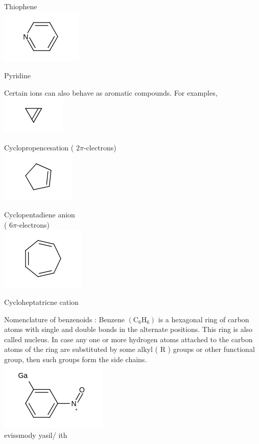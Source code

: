 \documentclass[10pt]{article}
\begin{document}
Thiophene\\
\includegraphics{smile-6d0b136b531f0167fb56310bb3c6582bb63e0cbf}

Pyridine

Certain ions can also behave as aromatic compounds. For examples,\\
\includegraphics{smile-80984b05dfd11e77fdfc068bf3f1a9c52c7c6dd6}

Cyclopropencesation ( $2 \pi$-clectrons)\\
\includegraphics{smile-2ad247b9a4df890bcae69cb2cc2f2557dd064282}

Cyclopentadiene anion\\
( $6 \pi$-electrons)\\
\includegraphics{smile-909aad98b08bb44b9003cf03e47d1d2420ae24d8}

Cycloheptatricne cation

Nomenclature of benzenoids : Benzene $\left(\mathrm{C}_{6} \mathrm{H}_{6}\right)$ is a hexagonal ring of carbon atoms with single and double bonds in the alternate positions. This ring is also called nucleus. In case any one or more hydrogen atoms attached to the carbon atoms of the ring are substituted by some alkyl ( R ) groups or other functional group, then such groups form the side chains.\\
\includegraphics{smile-4d4fe36e4ba00691b37e9e6cc4b611b5191af8dc}\\
evissmody yasil/ ith
\end{document}
